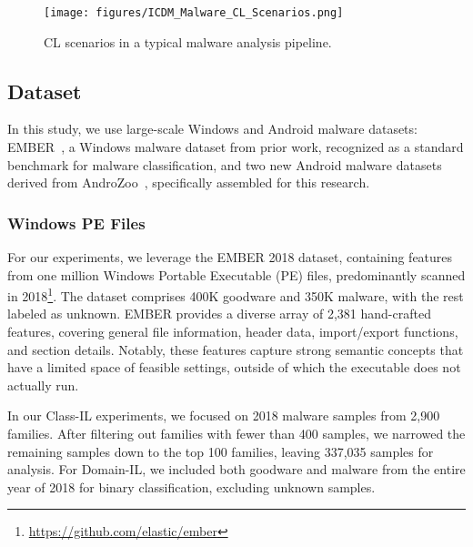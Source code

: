 \begin{figure}
    \centering
    \texttt{[image: figures/ICDM\_Malware\_CL\_Scenarios.png]}
    \caption{CL scenarios in a typical malware analysis pipeline.}
    \label{fig:cl-scenarios}
    \vskip -0.4cm
\end{figure}


\subsection{Dataset}\label{sec:dataset}

In this study, we use large-scale Windows and Android malware datasets: EMBER~\cite{ember}, a Windows malware dataset from prior work, recognized as a standard benchmark for malware classification, and two new Android malware datasets derived from AndroZoo~\cite{AndroZoo}, specifically assembled for this research.

\subsubsection{Windows PE Files}

For our experiments, we leverage the EMBER 2018 dataset, containing features from one million Windows Portable Executable (PE) files, predominantly scanned in 2018\footnote{\url{https://github.com/elastic/ember}}. The dataset comprises 400K goodware and 350K malware, with the rest labeled as unknown. EMBER provides a diverse array of 2,381 hand-crafted features, covering general file information, header data, import/export functions, and section details. Notably, these features capture strong semantic concepts that have a limited space of feasible settings, outside of which the executable does not actually run.

In our Class-IL experiments, we focused on 2018 malware samples from 2,900 families. After filtering out families with fewer than 400 samples, we narrowed the remaining samples down to the top 100 families, leaving 337,035 samples for analysis. For Domain-IL, we included both goodware and malware from the entire year of 2018 for binary classification, excluding unknown samples.

